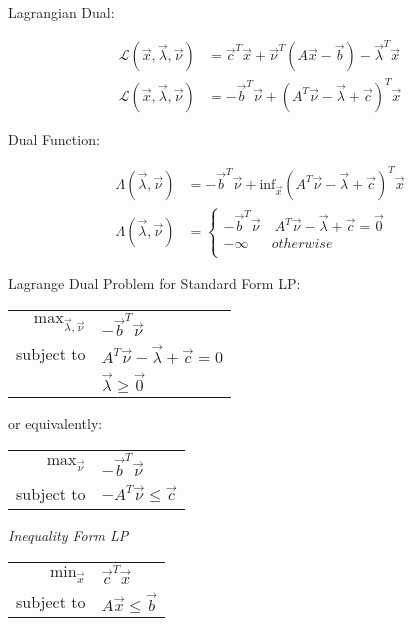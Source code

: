 Lagrangian Dual:

\begin{align*}
  \mathcal{L}(\vec{x},\vec{\lambda},\vec{\nu}) & =
    \vec{c}^T\vec{x} + \vec{\nu}^T(A\vec{x} - \vec{b}) - \vec{\lambda}^T\vec{x} \\
  \mathcal{L}(\vec{x},\vec{\lambda},\vec{\nu}) & =
    -\vec{b}^T\vec{\nu} + (A^T\vec{\nu} - \vec{\lambda} + \vec{c})^T\vec{x}
\end{align*}

Dual Function:

\begin{align*}
  \Lambda(\vec{\lambda},\vec{\nu}) & = -\vec{b}^T\vec{\nu} +
    \mathrm{inf}_{\vec{x}}(A^T\vec{\nu} - \vec{\lambda} + \vec{c})^T\vec{x} \\
  \Lambda(\vec{\lambda},\vec{\nu}) & = \begin{cases}
    -\vec{b}^T\vec{\nu} & \ A^T\vec{\nu} - \vec{\lambda} + \vec{c} = \vec{0} \\
    -\infty             & otherwise \\
  \end{cases}
\end{align*}

Lagrange Dual Problem for Standard Form LP:

\begin{tabular}{r l}
  $\mathrm{max}_{\vec{\lambda},\vec{\nu}}$ &
    $-\vec{b}^T\vec{\nu}$ \\
  subject to & $A^T\vec{\nu} - \vec{\lambda} + \vec{c} = 0$ \\
             & $\vec{\lambda} \geq \vec{0}$ \\
\end{tabular}

or equivalently:

\begin{tabular}{r l}
  $\mathrm{max}_{\vec{\nu}}$ &
    $-\vec{b}^T\vec{\nu}$ \\
  subject to & $-A^T\vec{\nu} \leq \vec{c}$ \\
\end{tabular}


\emph{Inequality Form LP}

\begin{tabular}{r l}
  $\mathrm{min}_{\vec{x}}$ & $\vec{c}^T\vec{x}$      \\
  subject to               & $A\vec{x} \leq \vec{b}$ \\
\end{tabular}


